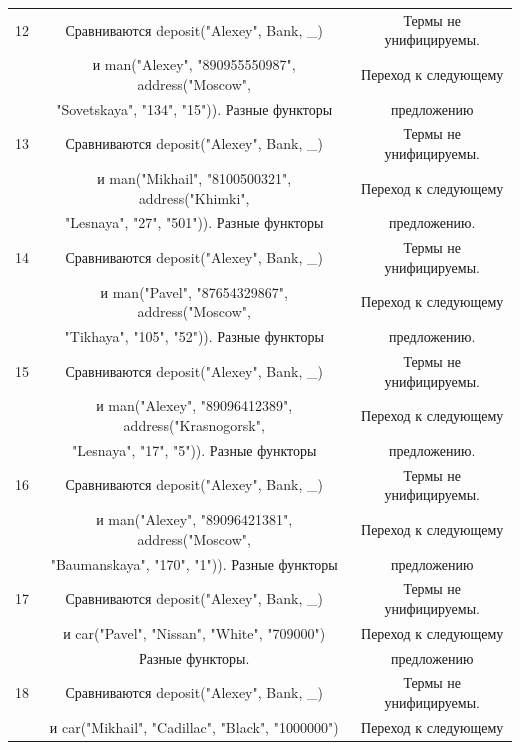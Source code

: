 \documentclass[12pt]{report}
\begin{document}
\begin{table}[H]
	\begin{center}
		\begin{tabular}{|c c c |} 
			\hline
			12 & Сравниваются deposit("Alexey"{}, Bank, \_) & Термы не унифицируемы. \\
			   & и man("Alexey"{}, "890955550987"{}, address("Moscow"{},  & Переход к следующему \\
			   & "Sovetskaya"{}, "134"{}, "15"{})). Разные функторы  & предложению \\
			\hline
			13 & Сравниваются deposit("Alexey"{}, Bank, \_) & Термы не унифицируемы. \\
			  & и man("Mikhail"{}, "8100500321"{}, address("Khimki"{}, & Переход к следующему \\
			  & "Lesnaya"{}, "27"{}, "501"{})). Разные функторы  & предложению. \\
			\hline
			14 & Сравниваются deposit("Alexey"{}, Bank, \_) & Термы не унифицируемы. \\
			  & и man("Pavel"{}, "87654329867"{}, address("Moscow"{}, & Переход к следующему \\
		  	  & "Tikhaya"{}, "105"{}, "52"{})). Разные функторы  & предложению. \\
			\hline
			15 & Сравниваются deposit("Alexey"{}, Bank, \_) & Термы не унифицируемы. \\
			  & и man("Alexey"{}, "89096412389"{}, address("Krasnogorsk"{}, & Переход к следующему \\
			  & "Lesnaya"{}, "17"{}, "5"{})). Разные функторы  & предложению. \\
			\hline
			16 & Сравниваются deposit("Alexey"{}, Bank, \_) & Термы не унифицируемы.\\
			  & и man("Alexey"{}, "89096421381"{}, address("Moscow"{}, & Переход к следующему  \\
			  & "Baumanskaya"{}, "170"{}, "1"{})). Разные функторы  & предложению \\
			\hline
		    17 & Сравниваются deposit("Alexey"{}, Bank, \_) & Термы не унифицируемы.\\
			   & и car("Pavel"{}, "Nissan"{}, "White"{}, "709000"{}) & Переход к следующему  \\
			   & Разные функторы. & предложению \\
			\hline
			18 & Сравниваются deposit("Alexey"{}, Bank, \_) & Термы не унифицируемы.\\
			   & и car("Mikhail"{}, "Cadillac"{}, "Black"{}, "1000000"{}) & Переход к следующему  \\

\end{tabular}
\end{center}
\end{table}
\end{document}
